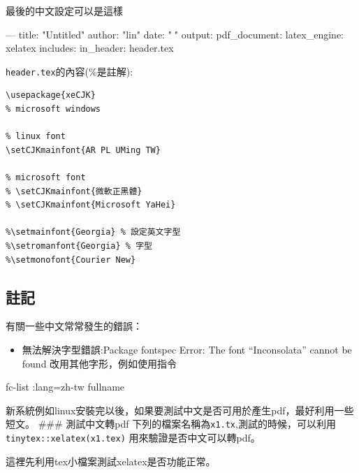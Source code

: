 \documentclass[]{book}
\newenvironment{Shaded}{\begin{snugshade}}{\end{snugshade}}
\newcommand{\AttributeTok}[1]{\textcolor[rgb]{0.77,0.63,0.00}{#1}}
\newcommand{\ExtensionTok}[1]{#1}
\newcommand{\FunctionTok}[1]{\textcolor[rgb]{0.00,0.00,0.00}{#1}}
\newcommand{\NormalTok}[1]{#1}
\newcommand{\OtherTok}[1]{\textcolor[rgb]{0.56,0.35,0.01}{#1}}
\newcommand{\StringTok}[1]{\textcolor[rgb]{0.31,0.60,0.02}{#1}}
\providecommand{\tightlist}{%
  \setlength{\itemsep}{0pt}\setlength{\parskip}{0pt}}
\theoremstyle{definition}
\theoremstyle{definition}
\theoremstyle{definition}
\theoremstyle{remark}
\begin{document}
最後的中文設定可以是這樣

\begin{Shaded}
\begin{Highlighting}[]

\OtherTok{---}
\FunctionTok{title:}\AttributeTok{ }\StringTok{"Untitled"}
\FunctionTok{author:}\AttributeTok{ }\StringTok{"lin"}
\FunctionTok{date:}\AttributeTok{ }\StringTok{""}
\FunctionTok{output:}
  \FunctionTok{pdf_document:}\AttributeTok{ }
    \FunctionTok{latex_engine:}\AttributeTok{ xelatex    }
    \FunctionTok{includes:}
      \FunctionTok{in_header:}\AttributeTok{ header.tex    }
\end{Highlighting}
\end{Shaded}

\texttt{header.tex}的內容(\%是註解):

\begin{verbatim}
\usepackage{xeCJK}
% microsoft windows

% linux font
\setCJKmainfont{AR PL UMing TW}

% microsoft font
% \setCJKmainfont{微軟正黑體}
% \setCJKmainfont{Microsoft YaHei}

%\setmainfont{Georgia} % 設定英文字型
%\setromanfont{Georgia} % 字型
%\setmonofont{Courier New}
\end{verbatim}

\subsection{註記}

有關一些中文常常發生的錯誤：

\begin{itemize}
\tightlist
\item
  無法解決字型錯誤:Package fontspec Error: The font ``Inconsolata''
  cannot be found 改用其他字形，例如使用指令
\end{itemize}

\begin{Shaded}
\begin{Highlighting}[]
 \ExtensionTok{fc-list}\NormalTok{ :lang=zh-tw fullname}
\end{Highlighting}
\end{Shaded}

新系統例如linux安裝完以後，如果要測試中文是否可用於產生pdf，最好利用一些短文。
\#\#\# 測試中文轉pdf
下列的檔案名稱為\texttt{x1.tx},測試的時候，可以利用\texttt{tinytex::xelatex(x1.tex)}
用來驗證是否中文可以轉pdf。

這裡先利用tex小檔案測試xelatex是否功能正常。
\end{document}
